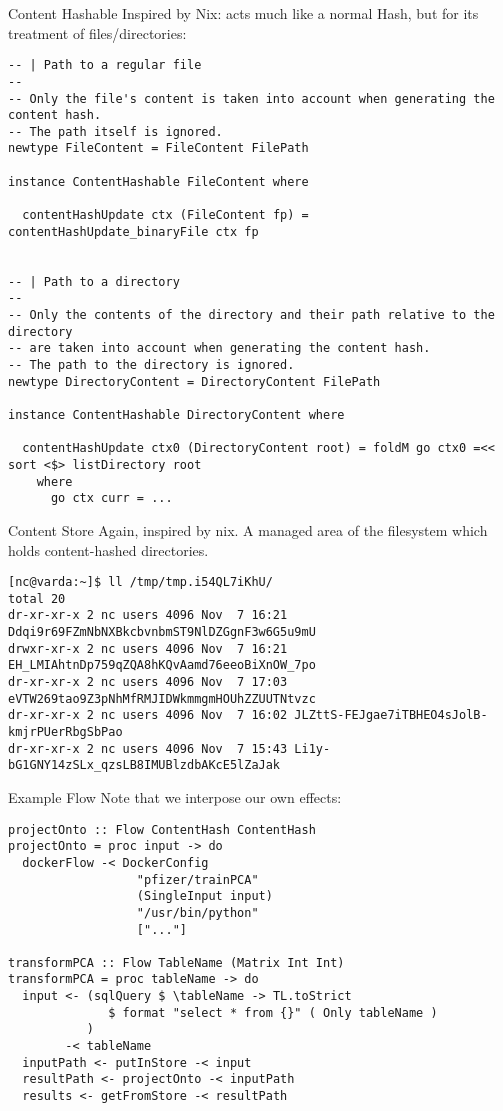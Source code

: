 \documentclass[11pt]{beamer}
\begin{document}
\begin{frame}[fragile]{Content Hashable}
Inspired by Nix: acts much like a normal Hash, but for its treatment of files/directories:
\begin{lstlisting}[basicstyle=\tiny]
-- | Path to a regular file
--
-- Only the file's content is taken into account when generating the content hash.
-- The path itself is ignored.
newtype FileContent = FileContent FilePath

instance ContentHashable FileContent where

  contentHashUpdate ctx (FileContent fp) = contentHashUpdate_binaryFile ctx fp


-- | Path to a directory
--
-- Only the contents of the directory and their path relative to the directory
-- are taken into account when generating the content hash.
-- The path to the directory is ignored.
newtype DirectoryContent = DirectoryContent FilePath

instance ContentHashable DirectoryContent where

  contentHashUpdate ctx0 (DirectoryContent root) = foldM go ctx0 =<< sort <$> listDirectory root
    where
      go ctx curr = ...
\end{lstlisting}
\end{frame}

\begin{frame}[fragile]{Content Store}
Again, inspired by nix. A managed area of the filesystem which holds content-hashed directories.
\begin{lstlisting}[basicstyle=\tiny]
[nc@varda:~]$ ll /tmp/tmp.i54QL7iKhU/
total 20
dr-xr-xr-x 2 nc users 4096 Nov  7 16:21 Ddqi9r69FZmNbNXBkcbvnbmST9NlDZGgnF3w6G5u9mU
drwxr-xr-x 2 nc users 4096 Nov  7 16:21 EH_LMIAhtnDp759qZQA8hKQvAamd76eeoBiXnOW_7po
dr-xr-xr-x 2 nc users 4096 Nov  7 17:03 eVTW269tao9Z3pNhMfRMJIDWkmmgmHOUhZZUUTNtvzc
dr-xr-xr-x 2 nc users 4096 Nov  7 16:02 JLZttS-FEJgae7iTBHEO4sJolB-kmjrPUerRbgSbPao
dr-xr-xr-x 2 nc users 4096 Nov  7 15:43 Li1y-bG1GNY14zSLx_qzsLB8IMUBlzdbAKcE5lZaJak

\end{lstlisting}
\end{frame}

\begin{frame}[fragile]{Example Flow}
Note that we interpose our own effects:
\begin{lstlisting}[basicstyle=\tiny]
projectOnto :: Flow ContentHash ContentHash
projectOnto = proc input -> do
  dockerFlow -< DockerConfig
                  "pfizer/trainPCA"
                  (SingleInput input)
                  "/usr/bin/python"
                  ["..."]

transformPCA :: Flow TableName (Matrix Int Int)
transformPCA = proc tableName -> do
  input <- (sqlQuery $ \tableName -> TL.toStrict
              $ format "select * from {}" ( Only tableName )
           )
        -< tableName
  inputPath <- putInStore -< input
  resultPath <- projectOnto -< inputPath
  results <- getFromStore -< resultPath
\end{lstlisting}
\end{frame}
\end{document}
